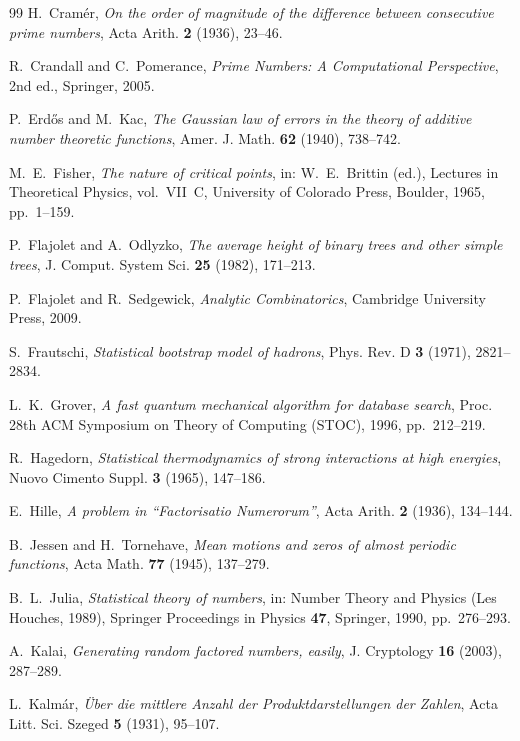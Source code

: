 \documentclass[11pt]{article}
\numberwithin{equation}{section}
\theoremstyle{plain}
\theoremstyle{definition}
\theoremstyle{remark}
\begin{document}
\begin{thebibliography}{99}
H.~Cram\'er,
\emph{On the order of magnitude of the difference between consecutive prime numbers},
Acta Arith. \textbf{2} (1936), 23--46.

R.~Crandall and C.~Pomerance,
\emph{Prime Numbers: A Computational Perspective},
2nd ed., Springer, 2005.

P.~Erd\H{o}s and M.~Kac,
\emph{The Gaussian law of errors in the theory of additive number theoretic
functions},
Amer. J. Math. \textbf{62} (1940), 738--742.

M.~E.~Fisher,
\emph{The nature of critical points},
in: W.~E.~Brittin (ed.), Lectures in Theoretical Physics, vol.~VII~C,
University of Colorado Press, Boulder, 1965, pp.~1--159.

P.~Flajolet and A.~Odlyzko,
\emph{The average height of binary trees and other simple trees},
J. Comput. System Sci. \textbf{25} (1982), 171--213.

P.~Flajolet and R.~Sedgewick,
\emph{Analytic Combinatorics},
Cambridge University Press, 2009.

S.~Frautschi,
\emph{Statistical bootstrap model of hadrons},
Phys. Rev. D \textbf{3} (1971), 2821--2834.

L.~K.~Grover,
\emph{A fast quantum mechanical algorithm for database search},
Proc. 28th ACM Symposium on Theory of Computing (STOC), 1996, pp.~212--219.

R.~Hagedorn,
\emph{Statistical thermodynamics of strong interactions at high energies},
Nuovo Cimento Suppl. \textbf{3} (1965), 147--186.

E.~Hille,
\emph{A problem in ``Factorisatio Numerorum''},
Acta Arith. \textbf{2} (1936), 134--144.

B.~Jessen and H.~Tornehave,
\emph{Mean motions and zeros of almost periodic functions},
Acta Math. \textbf{77} (1945), 137--279.

B.~L.~Julia,
\emph{Statistical theory of numbers},
in: Number Theory and Physics (Les Houches, 1989), Springer Proceedings in Physics
\textbf{47}, Springer, 1990, pp.~276--293.

A.~Kalai,
\emph{Generating random factored numbers, easily},
J. Cryptology \textbf{16} (2003), 287--289.

L.~Kalm\'ar,
\emph{\"Uber die mittlere Anzahl der Produktdarstellungen der Zahlen},
Acta Litt. Sci. Szeged \textbf{5} (1931), 95--107.


\end{thebibliography}
\end{document}
